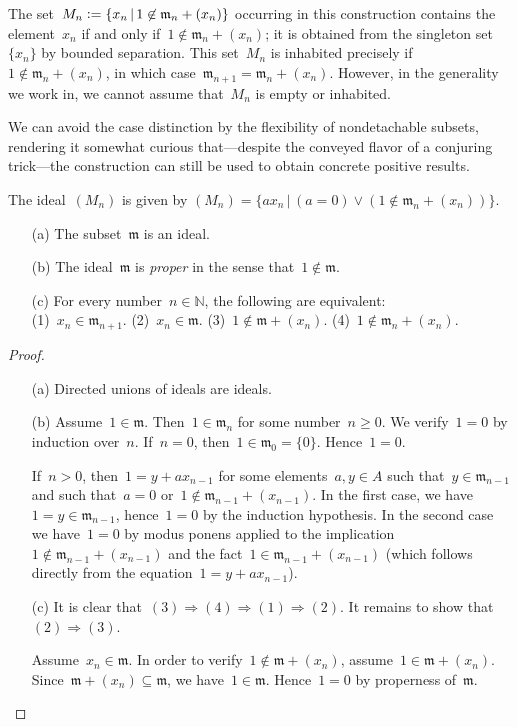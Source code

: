 \documentclass[envcountsect,envcountsame,runningheads]{llncs}
\newcommand{\mmm}{\mathfrak{m}}
\newcommand{\NN}{\mathbb{N}}
\newcommand{\defeq}{\vcentcolon=}
\renewcommand{\_}{\mathpunct{.}\,}
\begin{document}
The set~$M_n \defeq \{ x_n \,|\, 1 \not\in \mmm_n + (x_n) \}$ occurring in this
construction contains the element~$x_n$ if and only if~$1 \not\in \mmm_n +
(x_n)$; it is obtained from the singleton set~$\{x_n\}$ by bounded separation.
This set~$M_n$ is inhabited precisely if~$1 \not\in \mmm_n + (x_n)$, in which case~$\mmm_{n+1} = \mmm_n + (x_n)$.
However, in the generality we work in, we cannot assume that~$M_n$ is empty or
inhabited.

We can avoid the case distinction by the flexibility of nondetachable
subsets, rendering it somewhat curious that---despite the conveyed flavor of a
conjuring trick---the construction can still be used to obtain concrete
positive results.

The ideal~$(M_n)$ is given by
$(M_n) = \{ a x_n \,|\, (a = 0) \vee (1 \not\in \mmm_n + (x_n)) \}$.

\begin{lemma}\label{lemma:omnibus}
\begin{enumerate}
\item[\textnormal{(a)}] The subset~$\mmm$ is an ideal.
\item[\textnormal{(b)}] The ideal~$\mmm$ is \emph{proper} in the sense that~$1 \not\in \mmm$.
\item[\textnormal{(c)}] For every number~$n \in \NN$, the following are equivalent: \\
(1)~$x_n \in \mmm_{n+1}$.\quad
(2)~$x_n \in \mmm$.\quad
(3)~$1 \not\in \mmm + (x_n)$.\quad
(4)~$1 \not\in \mmm_n + (x_n)$.
\end{enumerate}
\end{lemma}

\begin{proof}\begin{enumerate}
\item[(a)] Directed unions of ideals are ideals.
\item[(b)] Assume~$1 \in \mmm$. Then~$1 \in \mmm_n$ for some number~$n \geq 0$. We
verify~$1 = 0$ by induction over~$n$.
If~$n = 0$, then~$1 \in \mmm_0 = \{0\}$. Hence~$1 = 0$.

If~$n > 0$, then~$1 = y + a x_{n-1}$ for some elements~$a,y \in A$ such that~$y
\in \mmm_{n-1}$ and such that~$a = 0$ or~$1 \not\in \mmm_{n-1} + (x_{n-1})$.
In the first case, we have~$1 = y \in \mmm_{n-1}$, hence~$1 = 0$ by the induction
hypothesis. In the second case we have~$1 = 0$ by modus ponens applied to the
implication~$1 \not\in \mmm_{n-1} + (x_{n-1})$ and the fact~$1 \in \mmm_{n-1} +
(x_{n-1})$ (which follows directly from the equation~$1 = y + a x_{n-1}$).
\item[(c)] It is clear that~$(3) \Rightarrow (4) \Rightarrow (1) \Rightarrow
(2)$. It remains to show that~$(2) \Rightarrow (3)$.

Assume~$x_n \in \mmm$. In order to verify~$1 \not\in \mmm + (x_n)$,
assume~$1 \in \mmm + (x_n)$. Since~$\mmm + (x_n) \subseteq \mmm$,
we have~$1 \in \mmm$. Hence~$1 = 0$ by properness of~$\mmm$.
\end{enumerate}\end{proof}
\end{document}

